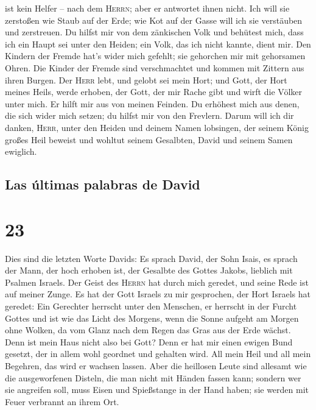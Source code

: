 ist kein Helfer -- nach dem \textsc{Herrn}; aber er antwortet ihnen
nicht.  Ich will sie zerstoßen wie Staub auf der Erde;
wie Kot auf der Gasse will ich sie verstäuben und zerstreuen.
 Du hilfst mir von dem zänkischen Volk und behütest mich,
dass ich ein Haupt sei unter den Heiden; ein Volk, das ich nicht kannte,
dient mir.  Den Kindern der Fremde hat's wider mich
gefehlt; sie gehorchen mir mit gehorsamen Ohren.  Die
Kinder der Fremde sind verschmachtet und kommen mit Zittern aus ihren
Burgen.  Der \textsc{Herr} lebt, und gelobt sei mein
Hort; und Gott, der Hort meines Heils, werde erhoben, 
der Gott, der mir Rache gibt und wirft die Völker unter mich.
 Er hilft mir aus von meinen Feinden. Du erhöhest mich
aus denen, die sich wider mich setzen; du hilfst mir von den Frevlern.
 Darum will ich dir danken, \textsc{Herr}, unter den
Heiden und deinem Namen lobsingen,  der seinem König
großes Heil beweist und wohltut seinem Gesalbten, David und seinem Samen
ewiglich.

\hypertarget{las-uxfaltimas-palabras-de-david}{%
\subsection{Las últimas palabras de
David}\label{las-uxfaltimas-palabras-de-david}}

\hypertarget{section-22}{%
\section{23}\label{section-22}}

 Dies sind die letzten Worte Davids: Es sprach David, der
Sohn Isais, es sprach der Mann, der hoch erhoben ist, der Gesalbte des
Gottes Jakobs, lieblich mit Psalmen Israels.  Der Geist
des \textsc{Herrn} hat durch mich geredet, und seine Rede ist auf meiner
Zunge.  Es hat der Gott Israels zu mir gesprochen, der
Hort Israels hat geredet: Ein Gerechter herrscht unter den Menschen, er
herrscht in der Furcht Gottes  und ist wie das Licht des
Morgens, wenn die Sonne aufgeht am Morgen ohne Wolken, da vom Glanz nach
dem Regen das Gras aus der Erde wächst.  Denn ist mein
Haus nicht also bei Gott? Denn er hat mir einen ewigen Bund gesetzt, der
in allem wohl geordnet und gehalten wird. All mein Heil und all mein
Begehren, das wird er wachsen lassen.  Aber die heillosen
Leute sind allesamt wie die ausgeworfenen Disteln, die man nicht mit
Händen fassen kann;  sondern wer sie angreifen soll, muss
Eisen und Spießstange in der Hand haben; sie werden mit Feuer verbrannt
an ihrem Ort.

